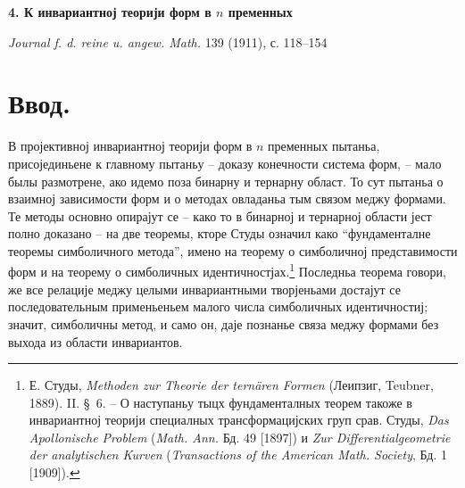 ﻿\documentclass[11pt]{article}
\begin{document}
\begin{center}
{\Large\bfseries 4. К инвариантној теорији форм в $n$ пременных}\par
\vspace{1.2em}
\emph{Journal f. d. reine u. angew. Math.} 139 (1911), с. 118--154
\end{center}

\section*{Ввод.}
В пројективној инвариантној теорији форм в $n$ пременных пытаньа, присојединьене к главному пытаньу -- доказу конечности система форм, -- мало былы размотрене, ако идемо поза бинарну и тернарну област. То сут пытаньа о взаимној зависимости форм и о методах овладаньа тым связом меджу формами. Те методы основно опирајут се -- како то в бинарној и тернарној области јест полно доказано -- на две теоремы, кторе Студы означил како ``фундаменталне теоремы симболичного метода'', имено на теорему о симболичној представимости форм и на теорему о симболичных идентичностјах.\footnote{Е. Студы, \emph{Methoden zur Theorie der ternären Formen} (Леипзиг, Teubner, 1889). II. \S\ 6. -- О наступаньу тыцх фундаменталных теорем такоже в инвариантној теорији специалных трансформацијских груп срав. Студы, \emph{Das Apollonische Problem} (\emph{Math. Ann.} Бд. 49 [1897]) и \emph{Zur Differentialgeometrie der analytischen Kurven} (\emph{Transactions of the American Math. Society}, Бд. 1 [1909]).} Последньа теорема говори, же все релације меджу целыми инвариантными творјеньами достајут се последовательным применьеньем малого числа симболичных идентичностиј; значит, симболичны метод, и само он, даје познанье связа меджу формами без выхода из области инвариантов.
\end{document}
